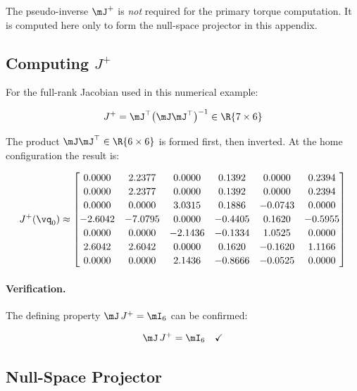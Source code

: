 The pseudo-inverse $\mJ^+$ is \emph{not} required for the primary torque
computation.
It is computed here only to form the null-space projector in this appendix.

\subsection{\texorpdfstring{Computing $J^+$}{Computing J+}}

For the full-rank Jacobian used in this numerical example:

\begin{equation}
J^+ = \mJ^\top\bigl(\mJ\mJ^\top\bigr)^{-1} \in \R{7\times6}
\end{equation}

The product $\mJ\mJ^\top \in \R{6\times6}$ is formed first, then inverted.
At the home configuration the result is:

\begin{equation}
\label{eq:Jp_panda}
J^+(\vq_0) \approx
\begin{bmatrix}
 0.0000 &  2.2377 &  0.0000 &  0.1392 &  0.0000 &  0.2394 \\[2pt]
 0.0000 &  2.2377 &  0.0000 &  0.1392 &  0.0000 &  0.2394 \\[2pt]
 0.0000 &  0.0000 &  3.0315 &  0.1886 & -0.0743 &  0.0000 \\[2pt]
-2.6042 & -7.0795 &  0.0000 & -0.4405 &  0.1620 & -0.5955 \\[2pt]
 0.0000 &  0.0000 & -2.1436 & -0.1334 &  1.0525 &  0.0000 \\[2pt]
 2.6042 &  2.6042 &  0.0000 &  0.1620 & -0.1620 &  1.1166 \\[2pt]
 0.0000 &  0.0000 &  2.1436 & -0.8666 & -0.0525 &  0.0000
\end{bmatrix}
\end{equation}

\paragraph{Verification.}
The defining property $\mJ\,J^+ = \mI_6$ can be confirmed:

\begin{equation}
\mJ\,J^+ = \mI_6 \quad \checkmark
\end{equation}

\subsection{Null-Space Projector}


